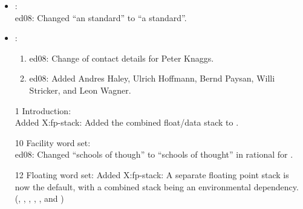 	\begin{itemize}
	\item {}: \\
		\textsf{ed08}: Changed ``an standard'' to ``a standard''.

	\item {}:
		\begin{enumerate}
		\item \textsf{ed08}: Change of contact details for Peter Knaggs.
		\item \textsf{ed08}: Added Andres Haley, Ulrich Hoffmann,
			Bernd Paysan, Willi Stricker, and Leon Wagner.
		\end{enumerate}

	\item[1] Introduction: \\
		Added \textsf{X:fp-stack}: Added the combined float/data
			stack to .

	\item[10] Facility word set: \\
		\textsf{ed08}: Changed ``schools of though'' to ``schools of
			thought'' in rational for .

	\item[12] Floating word set:
		Added \textsf{X:fp-stack}:
		A separate floating point stack is now the default,
		with a combined stack being an environmental
		dependency.
		(,
		 ,
		 ,
		 ,
		 , and
		 )
	\end{itemize}

